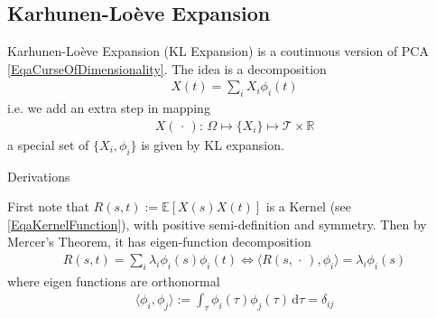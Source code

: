 





\subsection{Karhunen-Loève Expansion}

Karhunen-Loève Expansion (KL Expansion) is a coutinuous version of PCA \autoref{EqaCurseOfDimensionality}. The idea is a decomposition 
\begin{align}
    X(t)=\sum_{i}X_i\phi _i(t) 
\end{align}
i.e. we add an extra step in mapping
\begin{align}
    X(\, \cdot \, ):\, \Omega\mapsto \{X_i\}\mapsto \mathcal{T}\times \mathbb{R}  
\end{align}
a special set of $ \{X_i,\phi_i\} $ is given by KL expansion.

\begin{point}
    Derivations
\end{point}

First note that $ R(s,t):=\mathbb{E}\left[ X(s)X(t) \right] $ is a Kernel (see \autoref{EqaKernelFunction}), with positive semi-definition and symmetry. Then by Mercer's Theorem, it has eigen-function decomposition
\begin{align}
    R(s,t) =\sum_{i} \lambda _i\phi _i(s)\phi _i(t) \Leftrightarrow \langle R(s,\, \cdot \, ),\phi_i\rangle = \lambda _i\phi_i(s)
\end{align}
where eigen functions are orthonormal
\begin{align}
    \langle \phi _i, \phi _j \rangle := \int_\tau \phi _i(\tau)\phi _j(\tau)\,\mathrm{d}\tau = \delta _{ij}
\end{align}

